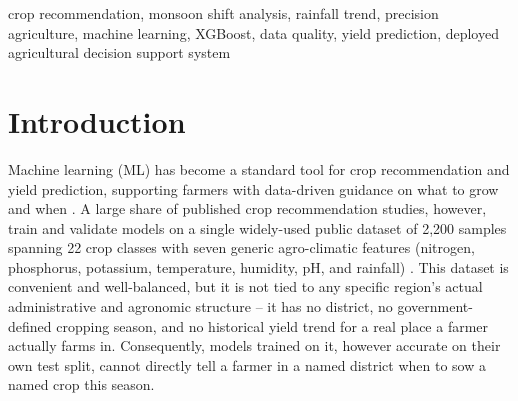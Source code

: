 \documentclass[conference]{IEEEtran}
\begin{document}
\begin{abstract}
Area value was dropped). After this correction, we trained and fairly compared three
regression models -- a decision tree, a random forest, and XGBoost -- for
district-level yield estimation, with hyperparameters tuned under matched budgets
(tree count $\times$ depth) rather than leaving the gradient-boosted model
under-regularized relative to the bagged baseline. The tuned XGBoost model achieved
the best held-out performance (test $R^2 = 96.98\%$, MAE $= 1.45$, RMSE $= 3.82$)
against Random Forest ($R^2 = 96.57\%$) and a single Decision Tree ($R^2 = 95.27\%$),
confirmed with 5-fold cross-validation. The resulting recommendation pipeline --
climate retrieval, monsoon-shift-aware drought/flood risk assessment, yield
prediction, sowing-window selection, and a data-driven confidence score -- is
deployed as a full-stack web application (Flask, PostgreSQL) that is also installable
as a Progressive Web App and as a native Android application, with real-time weather
integration replacing static climate estimates for the farmer-facing dashboard. We
discuss the practical significance of the data-quality finding, the deployed system's
architecture, and outline uncertainty quantification as a direction for future work.
\end{abstract}

\begin{IEEEkeywords}
crop recommendation, monsoon shift analysis, rainfall trend, precision agriculture,
machine learning, XGBoost, data quality, yield prediction, deployed agricultural
decision support system
\end{IEEEkeywords}

\section{Introduction}

Machine learning (ML) has become a standard tool for crop recommendation and yield
prediction, supporting farmers with data-driven guidance on what to grow and when
\cite{alam2025}. A large share of published crop recommendation studies, however, train
and validate models on a single widely-used public dataset of 2{,}200 samples spanning
22 crop classes with seven generic agro-climatic features (nitrogen, phosphorus,
potassium, temperature, humidity, pH, and rainfall) \cite{alam2025}. This dataset is
convenient and well-balanced, but it is not tied to any specific region's actual
administrative and agronomic structure -- it has no district, no government-defined
cropping season, and no historical yield trend for a real place a farmer actually
farms in. Consequently, models trained on it, however accurate on their own test split,
cannot directly tell a farmer in a named district when to sow a named crop this season.
\end{document}
